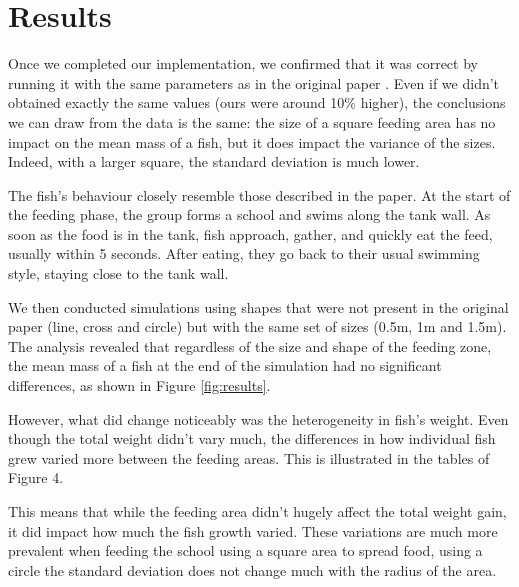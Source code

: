 \documentclass[9pt]{pnas-new}
\begin{document}
\section{Results}

Once we completed our implementation, we confirmed that it was correct by running it with the same parameters as in the original paper \cite{article}. Even if we didn't obtained exactly the same values (ours were around 10\% higher), the conclusions we can draw from the data is the same: the size of a square feeding area has no impact on the mean mass of a fish, but it does impact the variance of the sizes. Indeed, with a larger square, the standard deviation is much lower.


The fish's behaviour closely resemble those described in the paper. At the start of the feeding phase, the group forms a school and swims along the tank wall. As soon as the food is in the tank, fish approach, gather, and quickly eat the feed, usually within 5 seconds. After eating, they go back to their usual swimming style, staying close to the tank wall.

We then conducted simulations using shapes that were not present in the original paper (line, cross and circle) but with the same set of sizes (0.5m, 1m and 1.5m). The analysis revealed that regardless of the size and shape of the feeding zone, the mean mass of a fish at the end of the simulation had no significant differences, as shown in Figure \ref{fig:results}. 


However, what did change noticeably was the heterogeneity in fish's weight. Even though the total weight didn't vary much, the differences in how individual fish grew varied more between the feeding areas. This is illustrated in the tables of Figure 4.

This means that while the feeding area didn't hugely affect the total weight gain, it did impact how much the fish growth varied. These variations are much more prevalent when feeding the school using a square area to spread food, using a circle the standard deviation does not change much with the radius of the area.
\end{document}
